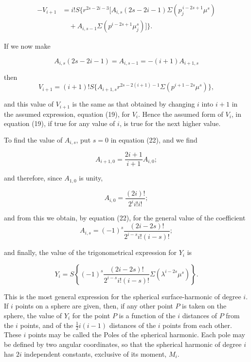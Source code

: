 \documentclass[11pt,a4paper]{article}
\begin{document}
\begin{equation}\tag{21}
\begin{split}
-V_{i+1}&=i!S\{r^{2s-2i-3}[A_{i,s}(2s-2i-1)\Sigma(p_j^{\,i-2s+1}\mu^s)\\
&\quad +A_{i,s-1}\Sigma(p^{i-2s+1}\mu_j^s)]\}.
\end{split}
\end{equation}

If we now make

\begin{equation}\tag{22}
A_{i,s}(2s-2i-1)=A_{i,s-1}=-(i+1)A_{i+1,s}
\end{equation}

then 
\begin{equation}\tag{23}
V_{i+1}=(i+1)!S\{A_{i+1,s}r^{2s-2(i+1)-1}\Sigma(p^{i+1-2s}\mu^s)\},
\end{equation}

and this value of $V_{i+1}$ is the same as that obtained by changing $i$ into $i+1$ in the assumed expression, equation (19), for $V_i$. Hence the assumed form of $V_i$, in equation (19), if true for any value of $i$, is true for the next higher value.

To find the value of $A_{i,s}$, put $s=0$ in equation (22), and we find

\begin{equation}\tag{24}
A_{i+1,0}=\frac{2i+1}{i+1}A_{i,0};
\end{equation}

and therefore, since $A_{1,0}$ is unity,

\begin{equation}\tag{25}
A_{i,0}=\frac{(2i)!}{2^i i!i!};
\end{equation}

and from this we obtain, by equation (22), for the general value of the coefficient
\begin{equation}\tag{26}
A_{i,s}=(-1)^s\frac{(2i-2s)!}{2^{i-s}i!(i-s)!};
\end{equation}

and finally, the value of the trigonometrical expression for  $Y_i$  is

\begin{equation}\tag{27}
Y_i=S\left\{(-1)^s\frac{(2i-2s)!}{2^{i-s}i!(i-s)!}\Sigma(\lambda^{i-2s}\mu^s)\right\}.
\end{equation}

This is the most general expression for the spherical surface-harmonic of degree $i$. If $i$ points on a sphere are given, then, if any other point $P$ is taken on the sphere, the value of $Y_i$ for the point $P$ is a function of the $i$ distances of $P$ from the $i$ points, and of the $\frac{1}{2}i(i-1)$ distances of the $i$ points from each other. These $i$ points may be called the Poles of the spherical harmonic. Each pole may be defined by two angular coordinates, so that the spherical harmonic of degree $i$ has $2i$ independent constants, exclusive of its moment, $M_i$.
\end{document}
